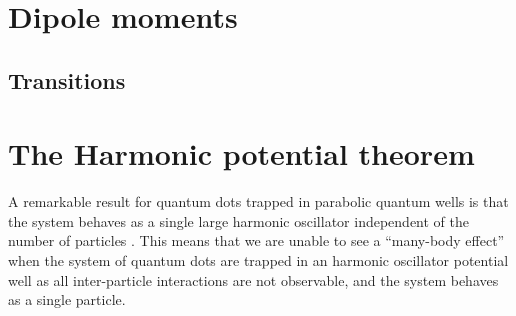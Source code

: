     \section{Dipole moments}
        \subsection{Transitions}

    \section{The Harmonic potential theorem}
        \label{sec:hpt}
        A remarkable result for quantum dots trapped in parabolic quantum wells
        is that the system behaves as a single large harmonic oscillator
        independent of the number of particles \cite{kohn, brey}.
        This means that we are unable to see a ``many-body effect'' when the
        system of quantum dots are trapped in an harmonic oscillator potential
        well as all inter-particle interactions are not observable, and the
        system behaves as a single particle.

